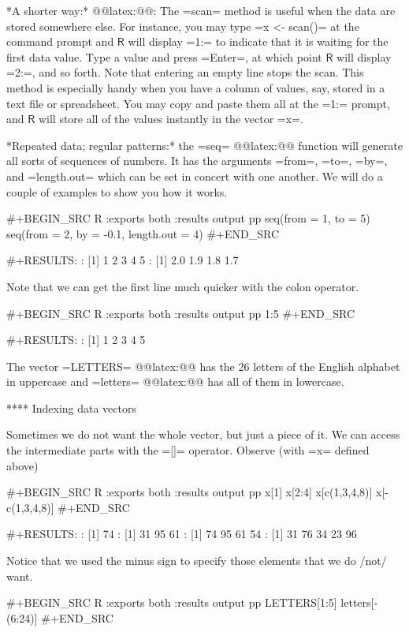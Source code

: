 *A shorter way:* @@latex:@@: The =scan= method is
useful when the data are stored somewhere else. For instance, you may
type =x <- scan()= at the command prompt and \(\mathsf{R}\) will
display =1:= to indicate that it is waiting for the first data
value. Type a value and press =Enter=, at which point \(\mathsf{R}\)
will display =2:=, and so forth. Note that entering an empty line
stops the scan. This method is especially handy when you have a column
of values, say, stored in a text file or spreadsheet. You may copy and
paste them all at the =1:= prompt, and \(\mathsf{R}\) will store all
of the values instantly in the vector =x=.

*Repeated data; regular patterns:* the =seq= @@latex:@@
function will generate all sorts of sequences of numbers. It has the
arguments =from=, =to=, =by=, and =length.out= which can be set in
concert with one another. We will do a couple of examples to show you
how it works.

#+BEGIN_SRC R :exports both :results output pp 
seq(from = 1, to = 5)
seq(from = 2, by = -0.1, length.out = 4)
#+END_SRC

#+RESULTS:
: [1] 1 2 3 4 5
: [1] 2.0 1.9 1.8 1.7

Note that we can get the first line much quicker with the colon
operator.

#+BEGIN_SRC R :exports both :results output pp 
1:5
#+END_SRC

#+RESULTS:
: [1] 1 2 3 4 5

The vector =LETTERS= @@latex:@@ has the 26
letters of the English alphabet in uppercase and
=letters= @@latex:@@ has all of them in
lowercase.

**** Indexing data vectors

Sometimes we do not want the whole vector, but just a piece of it. We
can access the intermediate parts with the =[]= operator. Observe
(with =x= defined above)

#+BEGIN_SRC R :exports both :results output pp 
x[1]
x[2:4]
x[c(1,3,4,8)]
x[-c(1,3,4,8)]
#+END_SRC

#+RESULTS:
: [1] 74
: [1] 31 95 61
: [1] 74 95 61 54
: [1] 31 76 34 23 96

Notice that we used the minus sign to specify those elements that we
do /not/ want.

#+BEGIN_SRC R :exports both :results output pp 
LETTERS[1:5]
letters[-(6:24)]
#+END_SRC

